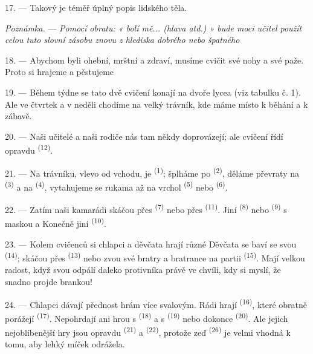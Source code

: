 17. --- Takový je téměř úplný popis lidského těla.

\textit{Poznámka.} --- \textit{Pomocí obratu: « bolí mě... (hlava atd.) » bude moci učitel
použít celou tuto slovní zásobu znovu z hlediska dobrého nebo špatného}

\VUsaut{5.0mm}
\VUsaut{2.4mm}
\VUsaut{3.0mm}

18. --- Abychom byli ohební, mrštní a zdraví, musíme cvičit své nohy a své paže. Proto si
hrajeme a pěstujeme 

19. --- Během týdne se tato dvě cvičení konají na dvoře lycea (viz tabulku č. 1). Ale ve
čtvrtek a v neděli chodíme na velký trávník, kde máme místo k běhání a k zábavě.

20. --- Naši učitelé a naši rodiče nás tam někdy doprovázejí; ale cvičení řídí opravdu
 \textsuperscript{(12)}.

21. --- Na trávníku, vlevo od vchodu, je  \textsuperscript{(1)};
šplháme po  \textsuperscript{(2)}, děláme převraty na 
\textsuperscript{(3)} a na  \textsuperscript{(4)}, vytahujeme se rukama až na
vrchol  \textsuperscript{(5)} nebo 
\textsuperscript{(6)}.

22. --- Zatím naši kamarádi skáčou přes  \textsuperscript{(7)} nebo
přes  \textsuperscript{(11)}. Jiní
 \textsuperscript{(8)} nebo  \textsuperscript{(9)} s
maskou a  Konečně jiní  \textsuperscript{(10)}.

\VUsaut{4.6mm}
\VUsaut{3.0mm}

23. --- Kolem cvičenců si chlapci a děvčata hrají různé  Děvčata se baví se svou
 \textsuperscript{(14)}; skáčou přes  \textsuperscript{(13)}
nebo zvou své bratry a bratrance na partii  \textsuperscript{(15)}. Mají
velkou radost, když svou  odpálí daleko  protivníka
právě ve chvíli, kdy si myslí, že snadno projde brankou!

24. --- Chlapci dávají přednost hrám více svalovým. Rádi hrají 
\textsuperscript{(16)}, které obratně porážejí  \textsuperscript{(17)}.
Nepohrdají ani hrou s  \textsuperscript{(18)} a s 
\textsuperscript{(19)} nebo dokonce  \textsuperscript{(20)}. Ale jejich
nejoblíbenější hry jsou opravdu  \textsuperscript{(21)} a 
\textsuperscript{(22)}, protože zeď
 \textsuperscript{(26)} je velmi vhodná k tomu, aby lehký míček
odrážela.

